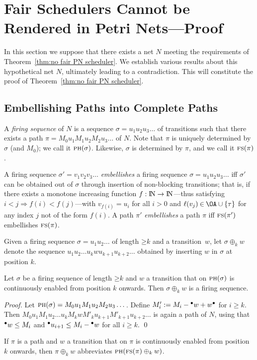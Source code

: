 \documentclass[smallcondensed]{svjour3}
\def\postcond#1{{#1}^\bullet}
\newcommand{\Thm}[1]{Theorem~\ref{thm:#1}}
\begin{document}
\section{Fair Schedulers Cannot be Rendered in Petri Nets---Proof}
\label{sec:proof PN}


In this section we suppose that there exists a net $N$
meeting the requirements of \Thm{no fair PN scheduler}.
We establish various results about this hypothetical net $N$, ultimately leading to a
contradiction. This will constitute the proof of \Thm{no fair PN scheduler}.

\subsection{Embellishing Paths into Complete Paths}

\newcommand{\fs}{\mbox{\sc fs}}
\newcommand{\ph}{\mbox{\sc ph}}
A \emph{firing sequence} of $N$ is a sequence $\sigma = u_1u_2u_3\dots$ of transitions such that
there exists a path $\pi = M_0 u_1 M_1 u_2 M_2 u_3 \dots$ of $N$. Note that $\pi$ is uniquely
determined by~$\sigma$ (and $M_{0}$); we call it $\ph(\sigma)$. Likewise, $\sigma$ is determined by $\pi$, and
we call it $\fs(\pi)$.

A firing sequence $\sigma'=v_1 v_2 v_3 \dots$ \emph{embellishes} a firing sequence $\sigma = u_1 u_2 u_3 \dots$
iff $\sigma'$ can be obtained out of $\sigma$ through insertion of non-blocking transitions;
that is, if there exists a monotone increasing function $f:\mathop{\rm I\mkern-2.5mu N}\nolimits \rightarrow\mathop{\rm I\mkern-2.5mu N}\nolimits $---thus satisfying $i\mathbin<j
\Rightarrow f(i)\mathbin<f(j)$---with $v_{f(i)}\mathbin=u_i$ for all $i\mathbin>0$ and $\ell(v_j)\mathbin\in\OA\cup\{\tau\}$ for any
index $j$ not of the form $f(i)$. A path $\pi'$ \emph{embellishes} a path $\pi$ iff $\fs(\pi')$
embellishes $\fs(\pi)$.

Given a firing sequence $\sigma\mathop=u_1u_2\dots$ of length $\mathord\geq k$ and a transition~$w$, let
$\sigma\oplus_kw$ denote the sequence $u_1 u_2 \dots u_{k}w u_{k+1} u_{k+2} \dots$ obtained by
inserting $w$ in $\sigma$ at position $k$.

\begin{lemma}\label{lem:one step embellishment}
Let $\sigma$ be a firing sequence of length $\mathord\geq k$ and $w$ a transition that on $\ph(\sigma)$ is continuously
enabled from position $k$ onwards. Then $\sigma\oplus_kw$ is a firing sequence.
\end{lemma}
\begin{proof}
Let $\ph(\sigma) = M_0 u_1 M_1 u_2 M_2 u_3 \dots$. Define
$M'_{i}:=M_i-\precond{w}+\postcond{w}$ for $i\geq k$. Then
$M_0 u_1 M_1 u_2 \dots u_{k} M_k w M'_k u_{k+1} M'_{k+1} u_{k+2} \dots$ is again a path of $N$,
using that $\precond{w}\leq M_i$ and $\precond{u_{i+1}} \leq M_i-\precond{w}$ for all $i\geq k$.
\qed
\end{proof}
If $\pi$ is a path and $w$ a transition that on $\pi$ is continuously enabled from position $k$
onwards, then $\pi\oplus_{k}w$ abbreviates $\ph(\fs(\pi)\oplus_{k}w)$.
\end{document}
